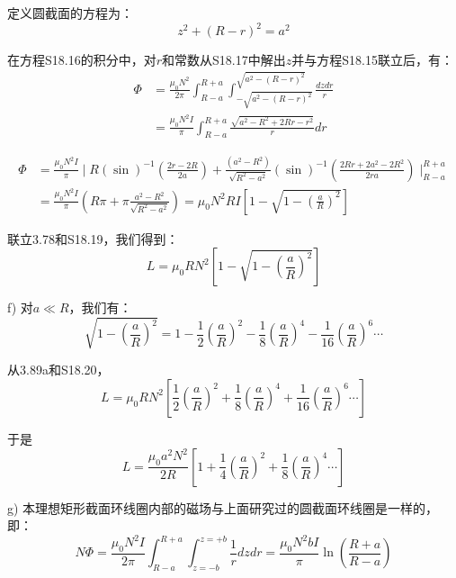 定义圆截面的方程为：
 \begin{equation*}%
z^2+(R-r)^2=a^2 \tag{S18.17}
\end{equation*}

在方程S18.16的积分中，对$r$和常数从S18.17中解出$z$并与方程S18.15联立后，有：
\begin{equation*}%
\begin{split}
\Phi&=\frac{\mu_0N^2}{2\pi}\int_{R-a}^{R+a}\int_{-\sqrt{a^2-(R-r)^2}}^{\sqrt{a^2-(R-r)^2}}\frac{dzdr}{r}\\
&=\frac{\mu_0N^2I}{\pi}\int_{R-a}^{R+a}\frac{\sqrt{a^2-R^2+2Rr-r^2}}{r}dr
\end{split}\tag{S18.18}
\end{equation*}

\begin{equation*}%
\begin{split}
\Phi&=\frac{\mu_0N^2I}{\pi}\mid R(\sin)^{-1}(\frac{2r-2R}{2a})+\frac{(a^2-R^2)}{\sqrt{R^2-a^2}}(\sin)^{-1}(\frac{2Rr+2a^2-2R^2}{2ra})\mid_{R-a}^{R+a} \\
&=\frac{\mu_0N^2I}{\pi}(R\pi+\pi\frac{a^2-R^2}{\sqrt{R^2-a^2}})=\mu_0N^2RI[1-\sqrt{1-(\frac{a}{R})^2}]
\end{split}\tag{S18.19}
\end{equation*}

联立3.78和S18.19，我们得到：
 \begin{equation*}%
L=\mu_0RN^2\left[1-\sqrt{1-\left(\frac{a}{R}\right)^2}\right] \tag{3.89a}
\end{equation*}

f) 对$a\ll R$，我们有：
\begin{equation*}%
\sqrt{1-\left(\frac{a}{R}\right)^2}=1-\frac{1}{2}(\frac{a}{R})^2-\frac{1}{8}(\frac{a}{R})^4-\frac{1}{16}(\frac{a}{R})^6\cdots \tag{S18.20}
\end{equation*}

从3.89a和S18.20，
\begin{equation*}
L=\mu_0RN^2\left[\frac{1}{2}(\frac{a}{R})^2+\frac{1}{8}(\frac{a}{R})^4+\frac{1}{16}(\frac{a}{R})^6\cdots\right]
\end{equation*}

于是
 \begin{equation*}%
L=\frac{\mu_0a^2N^2}{2R}\left[1+\frac{1}{4}(\frac{a}{R})^2+\frac{1}{8}(\frac{a}{R})^4\cdots\right] \tag{3.89b}
\end{equation*}

g) 本理想矩形截面环线圈内部的磁场与上面研究过的圆截面环线圈是一样的，即：
 \begin{equation*}%
N\Phi=\frac{\mu_0N^2I}{2\pi}\int_{R-a}^{R+a}\int_{z=-b}^{z=+b}\frac{1}{r}dzdr
=\frac{\mu_0N^2bI}{\pi}\ln\left(\frac{R+a}{R-a}\right) \tag{S18.21}
\end{equation*}

